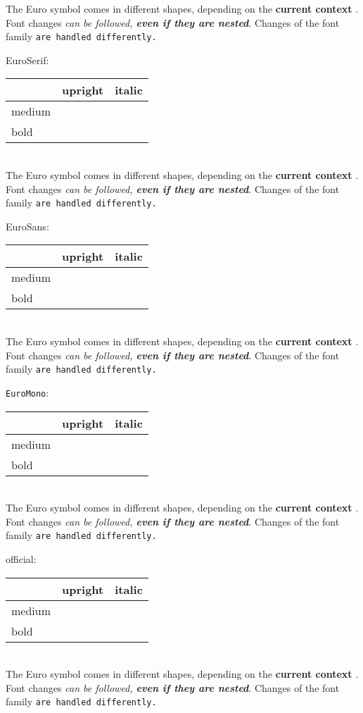 \documentclass{article}
\newcommand{\eutab}[1]{\begin{tabular}{l|cc}%
       & upright & italic \\%
\hline%
medium & \textup{\textmd{#1}} & \textit{\textmd{#1}} \\%
bold   & \textup{\textbf{#1}} & \textit{\textbf{#1}}%
\end{tabular}}
\begin{document}
\def\sampletext{%
The Euro symbol \eur{} comes in different shapes, depending on the
\textbf{current context \eur}. Font changes \textit{can \eur{} be followed,
\textbf{even if \eur{} they are nested}}. \textsf{Changes of \eur{} the font
family} \texttt{are handled \eur{} differently.}
}

\let\eur\EUR
\sampletext

\textrm{EuroSerif}:\\
\eutab{\EURtm}\\
\let\eur\EURtm
\sampletext

\textsf{EuroSans}:\\
\eutab{\EURhv}\\
\let\eur\EURhv
\sampletext

\texttt{EuroMono}:\\
\eutab{\EURcr}\\
\let\eur\EURcr
\sampletext

\textrm{official}:\\
\eutab{\EURofc}\\
\let\eur\EURofc
\sampletext
\end{document}
